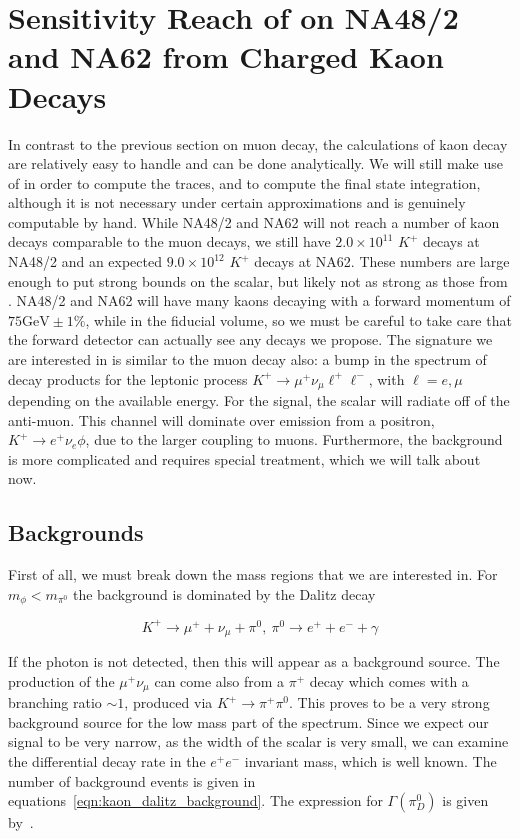 \section{Sensitivity Reach of on NA48/2 and NA62 from Charged Kaon Decays}
In contrast to the previous section on muon decay, the calculations of kaon decay are relatively easy to handle and can be done analytically.
We will still make use of \feyncalc in order to compute the traces, and \mathematica to compute the final state integration, although it is not necessary under certain approximations and is genuinely computable by hand.
While NA48/2 and NA62 will not reach a number of kaon decays comparable to the muon decays, we still have $2.0 \times 10^{11}$ $K^+$ decays at NA48/2 and an expected $9.0 \times 10^{12}$ $K^+$ decays at NA62.
These numbers are large enough to put strong bounds on the scalar, but likely not as strong as those from \mueee.
NA48/2 and NA62 will have many kaons decaying with a forward momentum of $75\textrm{GeV} \pm 1\%$, while in the fiducial volume, so we must be careful to take care that the forward detector can actually see any decays we propose.
The signature we are interested in is similar to the muon decay also: a bump in the spectrum of decay products for the leptonic process $K^+ \rightarrow \mu^+ \nu_\mu \ell^+ \ell^-$, with $\ell = e, \mu$ depending on the available energy.
For the signal, the scalar will radiate off of the anti-muon.
This channel will dominate over emission from a positron, $K^+ \rightarrow e^+ \nu_e \phi$, due to the larger coupling to muons.
Furthermore, the background is more complicated and requires special treatment, which we will talk about now.

\subsection{Backgrounds}
First of all, we must break down the mass regions that we are interested in.
For $m_\phi < m_{\pi^0}$ the background is dominated by the Dalitz decay

\begin{equation}
K^+ \rightarrow \mu^+ + \nu_\mu + \pi^0,~\pi^0 \rightarrow e^+ + e^- + \gamma
\end{equation}

\noindent If the photon is not detected, then this will appear as a background source.
The production of the $\mu^+ \nu_\mu$ can come also from a $\pi^+$ decay which comes with a branching ratio $\sim 1$, produced via $K^+ \rightarrow \pi^+ \pi^0$.
This proves to be a very strong background source for the low mass part of the spectrum.
Since we expect our signal to be very narrow, as the width of the scalar is very small, we can examine the differential decay rate in the $e^+ e^-$ invariant mass, which is well known.
The number of background events is given in equations~\ref{eqn:kaon_dalitz_background}.
The expression for $\Gamma(\pi^0_D)$ is given by~\cite{Mikaelian:1972yg}.

